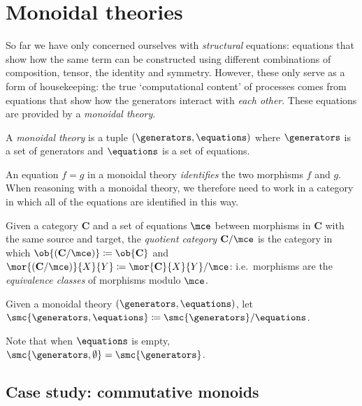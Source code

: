 \section{Monoidal theories}

So far we have only concerned ourselves with \emph{structural} equations:
equations that show how the same term can be constructed using different
combinations of composition, tensor, the identity and symmetry.
However, these only serve as a form of housekeeping: the true `computational
content' of processes comes from equations that show how the generators interact
with \emph{each other}.
These equations are provided by a \emph{monoidal theory}.

\begin{definition}
    A \emph{monoidal theory} is a tuple \((\generators, \equations)\) where
    \(\generators\) is a set of generators and \(\equations\) is a set of
    equations.
\end{definition}

An equation \(f = g\) in a monoidal theory \emph{identifies} the two morphisms
\(f\) and \(g\).
When reasoning with a monoidal theory, we therefore need to work in a category
in which all of the equations are identified in this way.

\begin{definition}
    Given a category \(\mathbf{C}\) and a set of equations \(\mce\) between
    morphisms in \(\mathbf{C}\) with the same source and target, the
    \emph{quotient category} \(\mathbf{C} / \mce\) is the category in which
    \(\ob{(\mathbf{C} / \mce)} \coloneqq \ob{\mathbf{C}}\) and \(
            \mor{(\mathbf{C} / \mce)}{X}{Y}
            \coloneqq
            \mor{\mathbf{C}}{X}{Y} / \mce
    \): i.e.\ morphisms are the \emph{equivalence classes} of morphisms
    modulo \(\mce\).
\end{definition}

\begin{definition}
    Given a monoidal theory \((\generators, \equations)\), let
    \(\smc{\generators, \equations} \coloneqq \smc{\generators} / \equations\).
\end{definition}

Note that when \(\equations\) is empty,
\(\smc{\generators, \emptyset} = \smc{\generators}\).

\subsection{Case study: commutative monoids}

